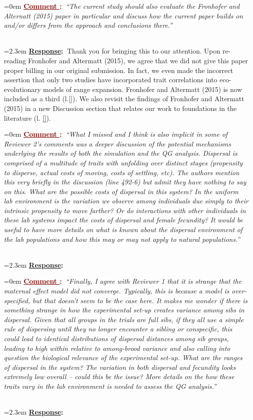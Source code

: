 \documentclass[12pt]{article}
\newcounter{cN}
\newcommand{\comment}[1]{
	\vspace{2em}
	\refstepcounter{cN} %
	\noindent \hangindent=0em \textbf{\textcolor{Maroon}{\uline{Comment \thecN}:~}}\emph{``#1''}
	}
\newcommand{\response}[1]{
	\\[0.25em]
	\hangindent=2.3em \textbf{\textcolor{NavyBlue}{\uline{Response}:~}}#1
	}
\begin{document}
\comment{The current study should also evaluate the Fronhofer and Alternatt (2015) paper in particular and discuss how the current paper builds on and/or differs from the approach and conclusions there.}
\response{Thank you for bringing this to our attention. Upon re-reading Fronhofer and Altermatt (2015), we agree that we did not give this paper proper billing in our original submission. 
In fact, we even made the incorrect assertion that only two studies have incorporated trait correlations into eco-evolutionary models of range expansion. 
Fronhofer and Altermatt (2015) is now included as a third (l.\ref{}). 
We also revisit the findings of Fronhofer and Altermatt (2015) in a new Discussion section that relates our work to foundations in the literature (l. \ref{}).}

\comment{What I missed and I think is also implicit in some of Reviewer 2’s comments was a deeper discussion of the potential mechanisms underlying the results of both the simulation and the QG analysis.
Dispersal is comprised of a multitude of traits with unfolding over distinct stages (propensity to disperse, actual costs of moving, costs of settling, etc).
The authors mention this very briefly in the discussion (line 492-6) but admit they have nothing to say on this.
What are the possible costs of dispersal in this system?
In the uniform lab environment is the variation we observe among individuals due simply to their intrinsic propensity to move farther?
Or do interactions with other individuals in these lab systems impact the costs of dispersal and female fecundity?
It would be useful to have more details on what is known about the dispersal environment of the lab populations and how this may or may not apply to natural populations.}
\response{}

\comment{Finally, I agree with Reviewer 1 that it is strange that the maternal effect model did not converge.
Typically, this is because a model is over-specified, but that doesn’t seem to be the case here.
It makes me wonder if there is something strange in how the experimental set-up creates variance among sibs in dispersal.
Given that all groups in the trials are full sibs, if they all use a simple rule of dispersing until they no longer encounter a sibling or conspecific, this could lead to identical distributions of dispersal distances among sib groups, leading to high within relative to among-brood variance and also calling into question the biological relevance of the experimental set-up.
What are the ranges of dispersal in the system? The variation in both dispersal and fecundity looks extremely low overall – could this be the issue?
More details on the how these traits vary in the lab environment is needed to assess the QG analysis.}
\response{}
\end{document}
